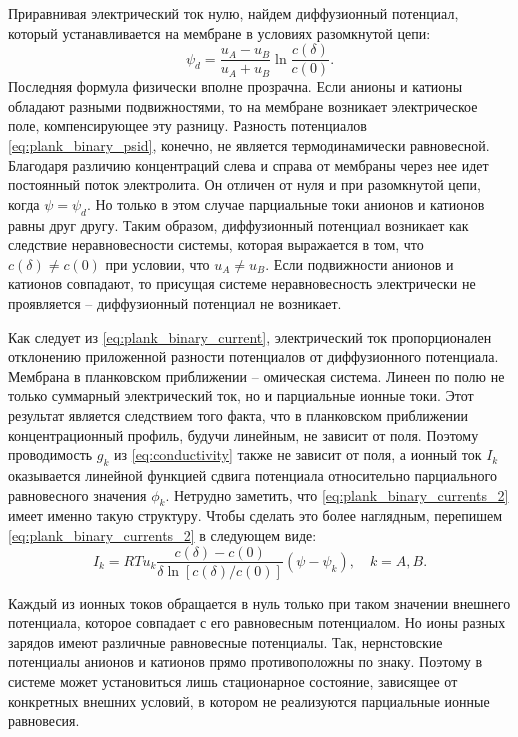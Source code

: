 Приравнивая электрический ток нулю, найдем диффузионный потенциал, который
устанавливается на мембране в условиях разомкнутой цепи:
\begin{equation}
    \psi_d = \frac{u_A - u_B}{u_A + u_B}\ln\frac{c(\delta)}{c(0)}.
    \label{eq:plank_binary_psid}
\end{equation}
Последняя формула физически вполне прозрачна. Если анионы и катионы обладают
разными подвижностями, то на мембране возникает электрическое поле,
компенсирующее эту разницу. Разность потенциалов \eqref{eq:plank_binary_psid},
конечно, не является термодинамически равновесной. Благодаря различию
концентраций слева и справа от мембраны через нее идет постоянный поток
электролита. Он отличен от нуля и при разомкнутой цепи, когда
\( \psi = \psi_d \). Но только в этом случае парциальные токи анионов и катионов
равны друг другу. Таким образом, диффузионный потенциал возникает как следствие
неравновесности системы, которая выражается в том, что \( c(\delta) \neq c(0) \)
при условии, что \( u_A \neq u_B \). Если подвижности анионов и катионов
совпадают, то присущая системе неравновесность электрически не проявляется --
диффузионный потенциал не возникает.

Как следует из \eqref{eq:plank_binary_current}, электрический ток
пропорционален отклонению приложенной разности потенциалов от диффузионного
потенциала. Мембрана в планковском приближении -- омическая система. Линеен по
полю не только суммарный электрический ток, но и парциальные ионные токи. Этот
результат является следствием того факта, что в планковском приближении
концентрационный профиль, будучи линейным, не зависит от поля. Поэтому
проводимость \(g_k\) из \eqref{eq:conductivity} также не зависит от поля, а
ионный ток \( I_k \) оказывается линейной функцией сдвига потенциала
относительно парциального равновесного значения \( \phi_k \). Нетрудно заметить,
что \eqref{eq:plank_binary_currents_2} имеет именно такую структуру. Чтобы
сделать это более наглядным, перепишем \eqref{eq:plank_binary_currents_2}
в следующем виде:
\begin{equation}
    I_k = RTu_k\frac{c(\delta) - c(0)}{\delta\ln[c(\delta)/c(0)]}(\psi-\psi_k),
    \quad k = A,B.
\end{equation}

Каждый из ионных токов обращается в нуль только при таком значении внешнего
потенциала, которое совпадает с его равновесным потенциалом. Но ионы разных
зарядов имеют различные равновесные потенциалы. Так, нернстовские потенциалы
анионов и катионов прямо противоположны по знаку. Поэтому в системе может
установиться лишь стационарное состояние, зависящее от конкретных внешних
условий, в котором не реализуются парциальные ионные равновесия.

